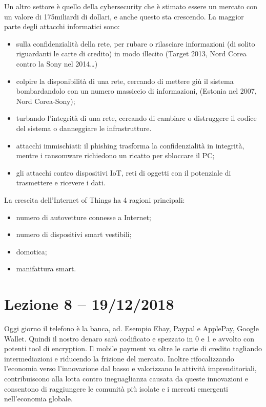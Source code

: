 \documentclass[a4page, 11pt]{article}
\begin{document}
Un altro settore è quello della cybersecurity che è stimato essere un mercato con un valore di 175miliardi di dollari, e anche questo sta crescendo.
La maggior parte degli attacchi informatici sono:
\begin{itemize}
  \item sulla confidenzialità della rete, per rubare o rilasciare informazioni (di solito riguardanti le carte di credito) in modo illecito (Target 2013, Nord Corea contro la Sony nel 2014\ldots{})
  \item colpire la disponibilità di una rete, cercando di mettere giù il sistema bombardandolo con un numero massiccio di informazioni, (Estonia nel 2007, Nord Corea-Sony);
  \item turbando l'integrità di una rete, cercando di cambiare o distruggere il codice del sistema o danneggiare le infrastrutture.
  \item attacchi immischiati: il phishing trasforma la confidenzialità in integrità, mentre i ransomware richiedono un ricatto per sbloccare il PC;
  \item gli attacchi contro dispositivi IoT, reti di oggetti con il potenziale di trasmettere e ricevere i dati.
\end{itemize}

La crescita dell'Internet of Things ha 4 ragioni principali:
\begin{itemize}
  \item numero di autovetture connesse a Internet;
  \item numero di dispositivi smart vestibili;
  \item domotica;
  \item manifattura smart.
\end{itemize}


\section*{Lezione 8 -- 19/12/2018}
Oggi giorno il telefono è la banca, ad. Esempio Ebay, Paypal e ApplePay, Google Wallet. Quindi il nostro denaro sarà codificato e spezzato in 0 e 1 e avvolto con potenti tool di encryption. Il mobile payment va oltre le carte di credito tagliando intermediazioni e riducendo la frizione del mercato. Inoltre rifocalizzando l’economia verso l’innovazione dal basso e valorizzano le attività imprenditoriali, contribuiscono alla lotta contro ineguaglianza causata da queste innovazioni e consentono di raggiungere le comunità più isolate e i mercati emergenti nell’economia globale.
\end{document}

